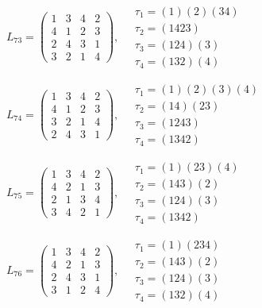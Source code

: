 $L_{73} = \begin{pmatrix} 1 & 3 & 4 & 2 \\ 4 & 1 & 2 & 3 \\ 2 & 4 & 3 & 1 \\ 3 & 2 & 1 & 4 \end{pmatrix}, \quad \begin{matrix} \tau_{1} = (1)(2)(3 4) \\ \tau_{2} = (1 4 2 3) \\ \tau_{3} = (1 2 4)(3) \\ \tau_{4} = (1 3 2)(4) \end{matrix}$

$L_{74} = \begin{pmatrix} 1 & 3 & 4 & 2 \\ 4 & 1 & 2 & 3 \\ 3 & 2 & 1 & 4 \\ 2 & 4 & 3 & 1 \end{pmatrix}, \quad \begin{matrix} \tau_{1} = (1)(2)(3)(4) \\ \tau_{2} = (1 4)(2 3) \\ \tau_{3} = (1 2 4 3) \\ \tau_{4} = (1 3 4 2) \end{matrix}$

$L_{75} = \begin{pmatrix} 1 & 3 & 4 & 2 \\ 4 & 2 & 1 & 3 \\ 2 & 1 & 3 & 4 \\ 3 & 4 & 2 & 1 \end{pmatrix}, \quad \begin{matrix} \tau_{1} = (1)(2 3)(4) \\ \tau_{2} = (1 4 3)(2) \\ \tau_{3} = (1 2 4)(3) \\ \tau_{4} = (1 3 4 2) \end{matrix}$

$L_{76} = \begin{pmatrix} 1 & 3 & 4 & 2 \\ 4 & 2 & 1 & 3 \\ 2 & 4 & 3 & 1 \\ 3 & 1 & 2 & 4 \end{pmatrix}, \quad \begin{matrix} \tau_{1} = (1)(2 3 4) \\ \tau_{2} = (1 4 3)(2) \\ \tau_{3} = (1 2 4)(3) \\ \tau_{4} = (1 3 2)(4) \end{matrix}$

